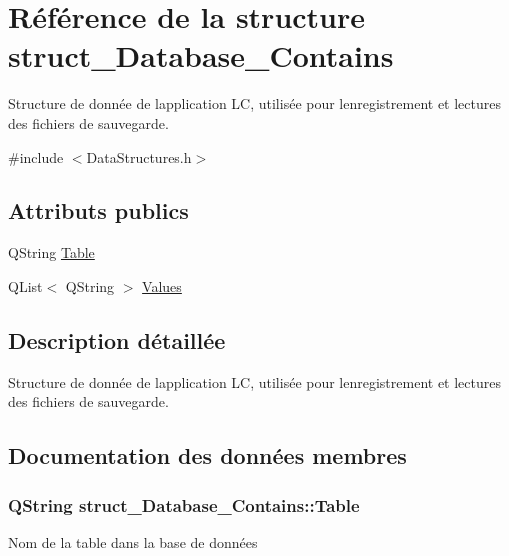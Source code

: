 \hypertarget{structstruct___database___contains}{}\section{Référence de la structure struct\+\_\+\+Database\+\_\+\+Contains}
\label{structstruct___database___contains}


Structure de donnée de l\textquotesingle{}application L\+C, utilisée pour l\textquotesingle{}enregistrement et lectures des fichiers de sauvegarde.  




{\ttfamily \#include $<$Data\+Structures.\+h$>$}

\subsection*{Attributs publics}
\begin{DoxyCompactItemize}
\item 
Q\+String \hyperlink{structstruct___database___contains_aa4208e8861fa15f84ef93ed8cd6b162e}{Table}
\item 
Q\+List$<$ Q\+String $>$ \hyperlink{structstruct___database___contains_ad6a0d26c2252dd085c56c29c438a132c}{Values}
\end{DoxyCompactItemize}


\subsection{Description détaillée}
Structure de donnée de l\textquotesingle{}application L\+C, utilisée pour l\textquotesingle{}enregistrement et lectures des fichiers de sauvegarde. 

\subsection{Documentation des données membres}
\hypertarget{structstruct___database___contains_aa4208e8861fa15f84ef93ed8cd6b162e}{}
\subsubsection[{Table}]{\setlength{\rightskip}{0pt plus 5cm}Q\+String struct\+\_\+\+Database\+\_\+\+Contains\+::\+Table}\label{structstruct___database___contains_aa4208e8861fa15f84ef93ed8cd6b162e}
Nom de la table dans la base de données \hypertarget{structstruct___database___contains_ad6a0d26c2252dd085c56c29c438a132c}{}
